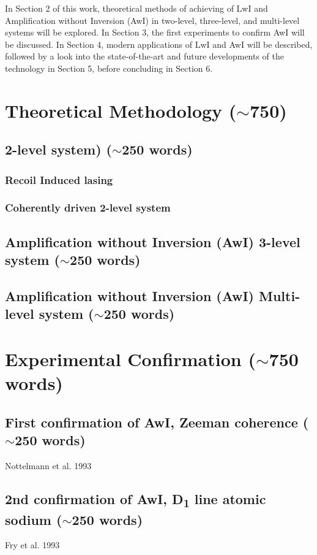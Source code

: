 \documentclass{article}
\begin{document}
In Section 2 of this work, theoretical methods of achieving of LwI and Amplification without Inversion (AwI) in two-level, three-level, and multi-level systems will be explored. In Section 3, the first experiments to confirm AwI will be discussed. In Section 4, modern applications of LwI and AwI will be described, followed by a look into the state-of-the-art and future developments of the technology in Section 5, before concluding in Section 6.

\section{Theoretical Methodology ($\sim$750)}
\subsection{2-level system) ($\sim$250 words)}
\subsubsection{Recoil Induced lasing}
\subsubsection{Coherently driven 2-level system}
\subsection{Amplification without Inversion (AwI) 3-level system ($\sim$250 words)}
\subsection{Amplification without Inversion (AwI) Multi-level system ($\sim$250 words)}

\section{Experimental Confirmation ($\sim$750 words)}
\subsection{First confirmation of AwI, Zeeman coherence ($\sim$250 words)}
Nottelmann et al. 1993 \cite{Nottelmann1993}
\subsection{2nd confirmation of AwI, D\textsubscript{1} line atomic sodium ($\sim$250 words)}
Fry et al. 1993 \cite{PhysRevLett.70.3235}
\end{document}
